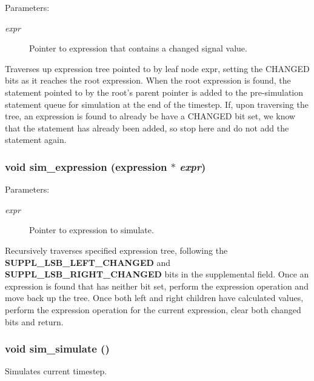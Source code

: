 \begin{Desc}
\item[Parameters:]
\begin{description}
\item[{\em expr}]Pointer to expression that contains a changed signal value.\end{description}
\end{Desc}
Traverses up expression tree pointed to by leaf node expr, setting the CHANGED bits as it reaches the root expression. When the root expression is found, the statement pointed to by the root's parent pointer is added to the pre-simulation statement queue for simulation at the end of the timestep. If, upon traversing the tree, an expression is found to already be have a CHANGED bit set, we know that the statement has already been added, so stop here and do not add the statement again. 
\subsubsection{\setlength{\rightskip}{0pt plus 5cm}void sim\_\-expression ({\bf expression} $\ast$ {\em expr})}\label{sim_8c_a8}


\begin{Desc}
\item[Parameters:]
\begin{description}
\item[{\em expr}]Pointer to expression to simulate.\end{description}
\end{Desc}
Recursively traverses specified expression tree, following the {\bf SUPPL\_\-LSB\_\-LEFT\_\-CHANGED} and {\bf SUPPL\_\-LSB\_\-RIGHT\_\-CHANGED} bits in the supplemental field. Once an expression is found that has neither bit set, perform the expression operation and move back up the tree. Once both left and right children have calculated values, perform the expression operation for the current expression, clear both changed bits and return. 
\subsubsection{\setlength{\rightskip}{0pt plus 5cm}void sim\_\-simulate ()}\label{sim_8c_a10}


Simulates current timestep.

